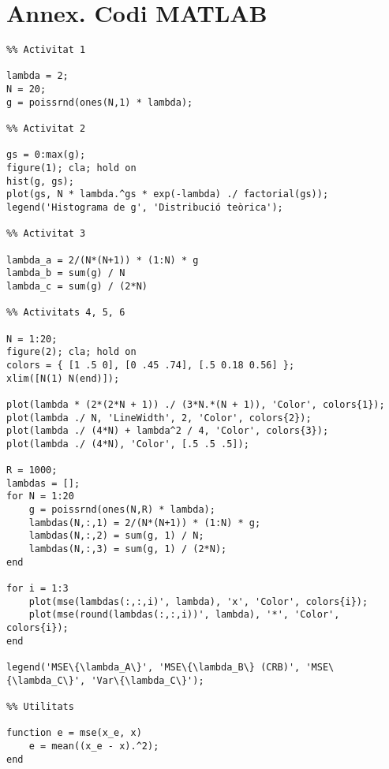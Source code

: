 \documentclass[catalan]{scrartcl}
\begin{document}
\clearpage
\part*{Annex. Codi MATLAB}


\begin{verbatim}
%% Activitat 1

lambda = 2;
N = 20;
g = poissrnd(ones(N,1) * lambda);

%% Activitat 2

gs = 0:max(g);
figure(1); cla; hold on
hist(g, gs);
plot(gs, N * lambda.^gs * exp(-lambda) ./ factorial(gs));
legend('Histograma de g', 'Distribució teòrica');

%% Activitat 3

lambda_a = 2/(N*(N+1)) * (1:N) * g
lambda_b = sum(g) / N
lambda_c = sum(g) / (2*N)

%% Activitats 4, 5, 6

N = 1:20;
figure(2); cla; hold on
colors = { [1 .5 0], [0 .45 .74], [.5 0.18 0.56] };
xlim([N(1) N(end)]);

plot(lambda * (2*(2*N + 1)) ./ (3*N.*(N + 1)), 'Color', colors{1});
plot(lambda ./ N, 'LineWidth', 2, 'Color', colors{2});
plot(lambda ./ (4*N) + lambda^2 / 4, 'Color', colors{3});
plot(lambda ./ (4*N), 'Color', [.5 .5 .5]);

R = 1000;
lambdas = [];
for N = 1:20
    g = poissrnd(ones(N,R) * lambda);
    lambdas(N,:,1) = 2/(N*(N+1)) * (1:N) * g;
    lambdas(N,:,2) = sum(g, 1) / N;
    lambdas(N,:,3) = sum(g, 1) / (2*N);
end

for i = 1:3
    plot(mse(lambdas(:,:,i)', lambda), 'x', 'Color', colors{i});
    plot(mse(round(lambdas(:,:,i))', lambda), '*', 'Color', colors{i});
end

legend('MSE\{\lambda_A\}', 'MSE\{\lambda_B\} (CRB)', 'MSE\{\lambda_C\}', 'Var\{\lambda_C\}');

%% Utilitats

function e = mse(x_e, x)
    e = mean((x_e - x).^2);
end
\end{verbatim}
\end{document}
